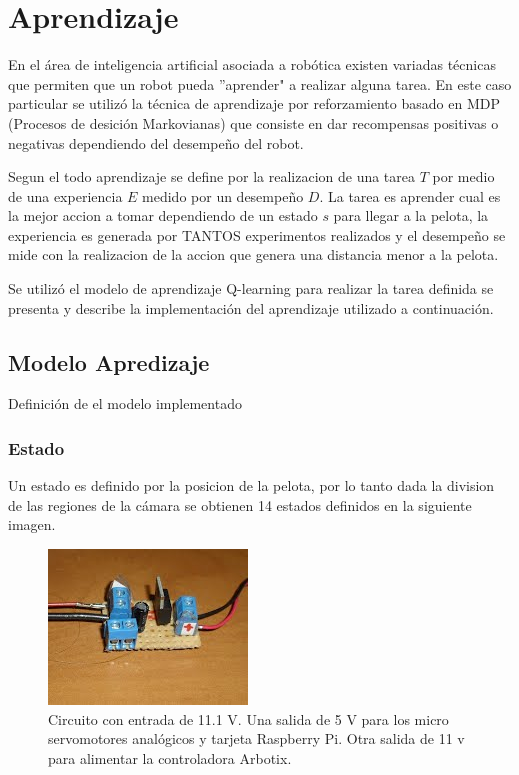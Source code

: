 
\section{Aprendizaje}
 
En el área de inteligencia artificial asociada a robótica existen variadas técnicas que permiten que un robot pueda ''aprender" a realizar alguna tarea. En este caso particular se utiliz\'o la técnica de aprendizaje por reforzamiento basado en MDP (Procesos de desici\'on Markovianas) que consiste en dar recompensas positivas o negativas dependiendo del desempeño del robot.


Segun el \cite{Mitchell} todo aprendizaje se define por la realizacion de una tarea $T$ por medio de una experiencia $E$ medido por un desempeño $D$. La tarea es aprender cual es la mejor accion a tomar dependiendo de un estado $s$ para llegar a la pelota, la experiencia es generada por TANTOS experimentos realizados y el desempeño se mide con la realizacion de la accion que genera una distancia menor a la pelota.

Se utilizó el modelo de aprendizaje Q-learning para realizar la tarea definida se presenta y describe la implementación del aprendizaje utilizado a continuación.

\subsection{Modelo Apredizaje}

Definici\'on de el modelo implementado

\subsubsection{Estado}

Un estado es definido por la posicion de la pelota, por lo tanto dada la division de las regiones de la c\'amara  se  obtienen 14 estados definidos en la siguiente imagen.

\begin{figure}[hbtp]
\centering
\includegraphics[scale=0.5]{imagenes/circuito.jpg}
\caption{Circuito con entrada de 11.1 V. Una salida de 5 V para los micro servomotores anal\'ogicos y tarjeta Raspberry Pi. Otra salida de 11 v para alimentar la controladora Arbotix.}
\label{fig:circuito}
\end{figure}

